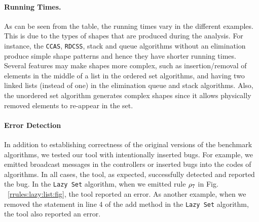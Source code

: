 \paragraph{Running Times.}
As can be seen from the table, the running times
vary in the different examples.
%
This is due to the types of shapes that are produced during the analysis.
%
For instance, the {\tt CCAS}, {\tt RDCSS}, stack and queue algorithms 
without an elimination produce simple shape patterns and hence they
have shorter running times.
%
Several features may make shapes more complex, such as
%
insertion/removal of elements in the middle of a list
in the ordered set algorithms, and
having two linked lists (instead of one)
 in the  elimination queue and stack algorithms.
%
Also, the
unordered set algorithm generates 
complex shapes since it allows 
physically removed elements to re-appear  in the set.

\paragraph{Error Detection}
 In addition to establishing correctness of the original versions of the
benchmark algorithms, we tested our tool with intentionally inserted bugs. For example, we emitted broadcast messages in the controllers or inserted bugs into the codes of algorithms. In all cases, the tool, as expected, successfully detected and reported the bug. In the {\tt Lazy Set} algorithm, when we emitted rule $\rho_7$ in Fig. ~\ref{rrules:lazy:list:fig}, the tool reported an error. As another example, when we removed the statement in line 4 of 
the add method in the {\tt Lazy Set} algorithm, the tool also reported an error.
 



